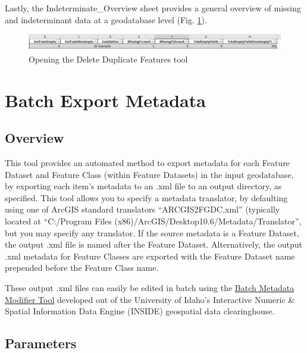 \documentclass[openany]{book}
\theoremstyle{definition}
\theoremstyle{definition}
\theoremstyle{definition}
\theoremstyle{remark}
\begin{document}
Lastly, the Indeterminate\_Overview sheet provides a general overview of
missing and indeterminant data at a geodatabase level (Fig.
\ref{fig:summIndtsheet4}).

\begin{figure}[H]

{\centering \includegraphics{figures/summIndt-sheet4} 

}

\caption{Opening the Delete Duplicate Features tool}\label{fig:summIndtsheet4}
\end{figure}

\hypertarget{exMeta}{\chapter{Batch Export Metadata}\label{exMeta}}

\section{Overview}\label{overview-9}

This tool provides an automated method to export metadata for each
Feature Dataset and Feature Class (within Feature Datasets) in the input
geodatabase, by exporting each item's metadata to an .xml file to an
output directory, as specified. This tool allows you to specify a
metadata translator, by defaulting using one of ArcGIS standard
translators ``ARCGIS2FGDC.xml'' (typically located at ``C:/Program Files
(x86)/ArcGIS/Desktop10.6/Metadata/Translator'', but you may specify any
translator. If the source metadata is a Feature Dataset, the output .xml
file is named after the Feature Dataset. Alternatively, the output .xml
metadata for Feature Classes are exported with the Feature Dataset name
prepended before the Feature Class name.

These output .xml files can easily be edited in batch using the
\href{http://insideidaho.org/helpdocs/batch_metadata_modifier_tool.html}{Batch
Metadata Modifier Tool} developed out of the University of Idaho's
Interactive Numeric \& Spatial Information Data Engine (INSIDE)
geospatial data clearinghouse.

\section{Parameters}\label{parameters-9}
\end{document}
